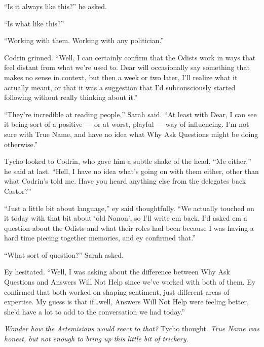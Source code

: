 ``Is it always like this?'' he asked.

``Is what like this?''

``Working with them. Working with any politician.''

Codrin grinned. ``Well, I can certainly confirm that the Odists work in ways that feel distant from what we're used to. Dear will occasionally say something that makes no sense in context, but then a week or two later, I'll realize what it actually meant, or that it was a suggestion that I'd subconsciously started following without really thinking about it.''

``They're incredible at reading people,'' Sarah said. ``At least with Dear, I can see it being sort of a positive — or at worst, playful — way of influencing. I'm not sure with True Name, and have no idea what Why Ask Questions might be doing otherwise.''

Tycho looked to Codrin, who gave him a subtle shake of the head. ``Me either,'' he said at last. ``Hell, I have no idea what's going on with them either, other than what Codrin's told me. Have you heard anything else from the delegates back Castor?''

``Just a little bit about language,'' ey said thoughtfully. ``We actually touched on it today with that bit about `old Nanon', so I'll write em back. I'd asked em a question about the Odists and what their roles had been because I was having a hard time piecing together memories, and ey confirmed that.''

``What sort of question?'' Sarah asked.

Ey hesitated. ``Well, I was asking about the difference between Why Ask Questions and Answers Will Not Help since we've worked with both of them. Ey confirmed that both worked on shaping sentiment, just different areas of expertise. My guess is that if\ldots well, Answers Will Not Help were feeling better, she'd have a lot to add to the conversation we had today.''

\emph{Wonder how the Artemisians would react to that?} Tycho thought. \emph{True Name was honest, but not enough to bring up this little bit of trickery.}

